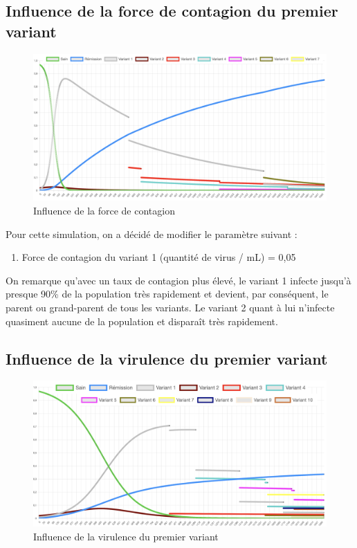 \documentclass{article}
\begin{document}
\subsection{Influence de la force de contagion du premier variant}

\begin{figure}[h]
    \includegraphics[width=\linewidth]{images/Simulation3.png}
    \caption{Influence de la force de contagion}
    \label{fig:simulation3}
\end{figure}

Pour cette simulation, on a décidé de modifier le paramètre suivant :
\begin{enumerate}
    \item Force de contagion du variant 1 (quantité de virus / mL) = 0,05 \\
\end{enumerate}

\noindent
On remarque qu'avec un taux de contagion plus élevé, le variant 1 infecte jusqu'à presque 90\% de la population très rapidement et devient, par conséquent, le parent ou grand-parent de tous les variants. Le variant 2 quant à lui n'infecte quasiment aucune de la population et disparaît très rapidement. \\

\subsection{Influence de la virulence du premier variant}

\begin{figure}[h]
    \includegraphics[width=\linewidth]{images/Simulation4.png}
    \caption{Influence de la virulence du premier variant}
    \label{fig:simulation4}
\end{figure}
\end{document}
